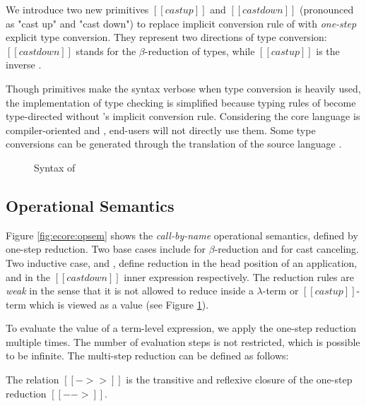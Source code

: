 We introduce two new primitives $[[castup]]$ and $[[castdown]]$
(pronounced as "cast up" and "cast down") to replace implicit
conversion rule of \cc with \emph{one-step} explicit type
conversion. They represent two directions of type conversion:
$[[castdown]]$ stands for the $\beta$-reduction of types, while
$[[castup]]$ is the inverse .

Though \cast primitives make the syntax verbose when type conversion
is heavily used, the implementation of type checking is simplified
because typing rules of \ecore become type-directed without \cc's
implicit conversion rule. Considering the core language is
compiler-oriented and , end-users will not directly use them. Some type
conversions can be generated through the translation of the source
language \fixme{(\S \ref{sec:src})}.

\begin{figure}
    \gram{\ottec\ottinterrule
        \ottG\ottinterrule
        \ottv}
    \caption{Syntax of \ecore}
    \label{fig:ecore:syntax}
\end{figure}

\subsection{Operational Semantics}\label{sec:ecore:opsem}

Figure \ref{fig:ecore:opsem} shows the \emph{call-by-name} operational
semantics, defined by one-step reduction. Two base cases include
 for $\beta$-reduction and 
for cast canceling. Two inductive case,  and
, define reduction in the head position of an
application, and in the $[[castdown]]$ inner expression
respectively. The reduction rules are \emph{weak} in the sense that it
is not allowed to reduce inside a $\lambda$-term or $[[castup]]$-term
which is viewed as a value (see Figure \ref{fig:ecore:syntax}).

To evaluate the value of a term-level expression, we apply the
one-step reduction multiple times. The number of evaluation steps is
not restricted, which is possible to be infinite. The multi-step
reduction can be defined as follows:

\begin{dfn}
    The relation $[[->>]]$ is the transitive and reflexive closure of
    the one-step reduction $[[-->]]$.
\end{dfn}


